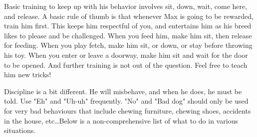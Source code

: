 \documentclass[pdftex,12pt]{article}
\begin{document}
\bigskip

Basic training to keep up with his behavior involves sit, down, wait, come
here, and release. A basic rule of thumb is that whenever Max is going to be
rewarded, train him first. This keeps him respectful of you, and entertains him
as his breed likes to please and be challenged. When you feed him, make him sit,
then release for feeding. When you play fetch, make him sit, or down, or stay
before throwing his toy. When you enter or leave a doorway, make him sit and
wait for the door to be opened. And further training is not out of the question.
Feel free to teach him new tricks!

\bigskip

Discipline is a bit different. He will misbehave, and when he does, he must be
told. Use "Eh" and "Uh-uh" frequently. "No" and "Bad dog" should only be used
for very bad behaviours that include chewing furniture, chewing shoes, accidents
in the house, etc\ldots Below is a non-comprehensive list of what to do in
various situations.

\bigskip
\end{document}
